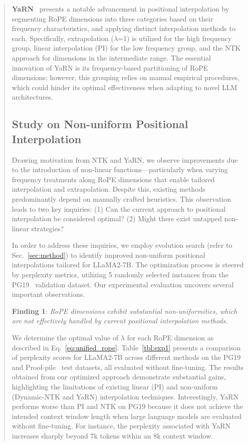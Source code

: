 \begin{abstract}
\textbf{YaRN}~\cite{yarn} presents a notable advancement in positional interpolation by segmenting RoPE dimensions into three categories based on their frequency characteristics, and applying distinct interpolation methods to each. Specifically, extrapolation ($\lambda$=1) is utilized for the high frequency group, linear interpolation (PI) for the low frequency group, and the NTK approach for dimensions in the intermediate range. The essential innovation of YaRN is its frequency-based partitioning of RoPE dimensions; however, this grouping relies on manual empirical procedures, which could hinder its optimal effectiveness when adapting to novel LLM architectures.

\subsection{Study on Non-uniform Positional Interpolation}

Drawing motivation from NTK and YaRN, we observe improvements due to the introduction of non-linear functions—particularly when varying frequency treatments along RoPE dimensions that enable tailored interpolation and extrapolation. Despite this, existing methods predominantly depend on manually crafted heuristics. This observation leads to two key inquiries: (1) Can the current approach to positional interpolation be considered optimal? (2) Might there exist untapped non-linear strategies?

In order to address these inquiries, we employ evolution search (refer to Sec.~\ref{sec:method}) to identify improved non-uniform positional interpolations tailored for LLaMA2-7B. The optimization process is steered by perplexity metrics, utilizing 5 randomly selected instances from the PG19~\cite{pg19} validation dataset. Our experimental evaluation uncovers several important observations.

\textbf{Finding 1}: \textit{RoPE dimensions exhibit substantial non-uniformities, which are not effectively handled by current positional interpolation methods.}

We determine the optimal value of $\lambda$ for each RoPE dimension as described in Eq.~\ref{eq:unified_rope}. Table~\ref{tbl:exp1} presents a comparison of perplexity scores for LLaMA2-7B across different methods on the PG19 and Proof-pile~\cite{proof-pile} test datasets, all evaluated without fine-tuning. The results obtained from our optimized approach demonstrate substantial gains, highlighting the limitations of existing linear (PI) and non-uniform (Dynamic-NTK and YaRN) interpolation techniques. Interestingly, YaRN performs worse than PI and NTK on PG19 because it does not achieve the intended context window length when large language models are evaluated without fine-tuning. For instance, the perplexity associated with YaRN increases sharply beyond 7k tokens within an 8k context window.


\end{abstract}
